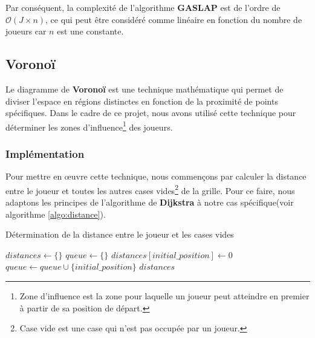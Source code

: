 Par conséquent, la complexité de l'algorithme \textbf{GASLAP} est de l'ordre de $\mathcal{O}(J \times n)$, ce qui peut être considéré comme
linéaire en fonction du nombre de joueurs car $n$ est une constante.\\

\subsection{Voronoï}
Le diagramme de \textbf{Voronoï} est une technique mathématique qui permet de diviser l'espace en régions distinctes en 
fonction de la proximité de points spécifiques. Dans le cadre de ce projet, nous avons utilisé cette technique pour 
déterminer les zones d'influence\footnote{Zone d'influence est la zone pour laquelle un joueur peut atteindre en premier à partir de sa position de départ.} 
des joueurs.
\tocless\subsubsection{Implémentation}
Pour mettre en œuvre cette technique, nous commençons par calculer la distance entre le joueur et toutes les autres 
cases vides\footnote{Case vide est une case qui n'est pas occupée par un joueur.} de la grille. Pour ce faire, nous adaptons 
les principes de l'algorithme de \textbf{Dijkstra} à notre cas spécifique(voir algorithme \ref{algo:distance}).\\

\begin{algorithm}[H]
	\caption{Détermination de la distance entre le joueur et les cases vides}
	\label{algo:distance}
	\DontPrintSemicolon
	$distances \gets \{\}$\;
	$queue \gets \{\}$\;
	$distances[initial\_position] \gets 0$\;
	$queue \gets queue \cup \{initial\_position\}$\;
	\Return $distances$\;
\end{algorithm}

